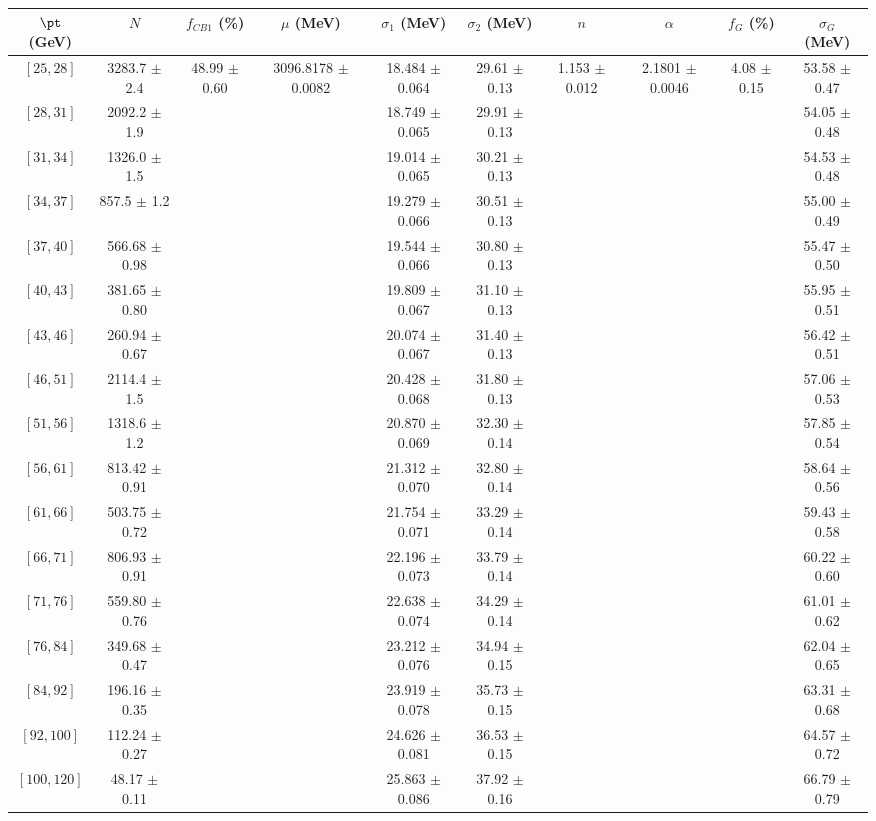 \begin{tabular}{c||c|c|c|c|c|c|c|c|c}
$\pt$ (GeV) & $N$ & $f_{CB1}$ (\%)  & $\mu$ (MeV) & $\sigma_1$ (MeV) & $\sigma_2$ (MeV) & $n$ & $\alpha$ & $f_G$ (\%) & $\sigma_G$ (MeV) \\
\hline
$[25, 28]$ & 3283.7 $\pm$ 2.4 & \multirow{17}{*}{48.99 $\pm$ 0.60} & \multirow{17}{*}{3096.8178 $\pm$ 0.0082} & 18.484 $\pm$ 0.064 & 29.61 $\pm$ 0.13 & \multirow{17}{*}{1.153 $\pm$ 0.012} & \multirow{17}{*}{2.1801 $\pm$ 0.0046} & \multirow{17}{*}{4.08 $\pm$ 0.15} & 53.58 $\pm$ 0.47\\
$[28, 31]$ & 2092.2 $\pm$ 1.9 &  &  & 18.749 $\pm$ 0.065 & 29.91 $\pm$ 0.13 &  &  &  & 54.05 $\pm$ 0.48\\
$[31, 34]$ & 1326.0 $\pm$ 1.5 &  &  & 19.014 $\pm$ 0.065 & 30.21 $\pm$ 0.13 &  &  &  & 54.53 $\pm$ 0.48\\
$[34, 37]$ & 857.5 $\pm$ 1.2 &  &  & 19.279 $\pm$ 0.066 & 30.51 $\pm$ 0.13 &  &  &  & 55.00 $\pm$ 0.49\\
$[37, 40]$ & 566.68 $\pm$ 0.98 &  &  & 19.544 $\pm$ 0.066 & 30.80 $\pm$ 0.13 &  &  &  & 55.47 $\pm$ 0.50\\
$[40, 43]$ & 381.65 $\pm$ 0.80 &  &  & 19.809 $\pm$ 0.067 & 31.10 $\pm$ 0.13 &  &  &  & 55.95 $\pm$ 0.51\\
$[43, 46]$ & 260.94 $\pm$ 0.67 &  &  & 20.074 $\pm$ 0.067 & 31.40 $\pm$ 0.13 &  &  &  & 56.42 $\pm$ 0.51\\
$[46, 51]$ & 2114.4 $\pm$ 1.5 &  &  & 20.428 $\pm$ 0.068 & 31.80 $\pm$ 0.13 &  &  &  & 57.06 $\pm$ 0.53\\
$[51, 56]$ & 1318.6 $\pm$ 1.2 &  &  & 20.870 $\pm$ 0.069 & 32.30 $\pm$ 0.14 &  &  &  & 57.85 $\pm$ 0.54\\
$[56, 61]$ & 813.42 $\pm$ 0.91 &  &  & 21.312 $\pm$ 0.070 & 32.80 $\pm$ 0.14 &  &  &  & 58.64 $\pm$ 0.56\\
$[61, 66]$ & 503.75 $\pm$ 0.72 &  &  & 21.754 $\pm$ 0.071 & 33.29 $\pm$ 0.14 &  &  &  & 59.43 $\pm$ 0.58\\
$[66, 71]$ & 806.93 $\pm$ 0.91 &  &  & 22.196 $\pm$ 0.073 & 33.79 $\pm$ 0.14 &  &  &  & 60.22 $\pm$ 0.60\\
$[71, 76]$ & 559.80 $\pm$ 0.76 &  &  & 22.638 $\pm$ 0.074 & 34.29 $\pm$ 0.14 &  &  &  & 61.01 $\pm$ 0.62\\
$[76, 84]$ & 349.68 $\pm$ 0.47 &  &  & 23.212 $\pm$ 0.076 & 34.94 $\pm$ 0.15 &  &  &  & 62.04 $\pm$ 0.65\\
$[84, 92]$ & 196.16 $\pm$ 0.35 &  &  & 23.919 $\pm$ 0.078 & 35.73 $\pm$ 0.15 &  &  &  & 63.31 $\pm$ 0.68\\
$[92, 100]$ & 112.24 $\pm$ 0.27 &  &  & 24.626 $\pm$ 0.081 & 36.53 $\pm$ 0.15 &  &  &  & 64.57 $\pm$ 0.72\\
$[100, 120]$ & 48.17 $\pm$ 0.11 &  &  & 25.863 $\pm$ 0.086 & 37.92 $\pm$ 0.16 &  &  &  & 66.79 $\pm$ 0.79\\
\end{tabular}
